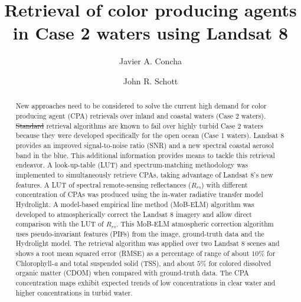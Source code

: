 \documentclass[onecolumn,3p,letterpaper]{elsarticle}
\providecommand{\DIFaddtex}[1]{{\protect\color{blue}\uwave{#1}}} %
\providecommand{\DIFdeltex}[1]{{\protect\color{red}\sout{#1}}}                      %
\providecommand{\DIFaddbegin}{} %
\providecommand{\DIFaddend}{} %
\providecommand{\DIFdelbegin}{} %
\providecommand{\DIFdelend}{} %
\providecommand{\DIFadd}[1]{\texorpdfstring{\DIFaddtex{#1}}{#1}} %
\providecommand{\DIFdel}[1]{\texorpdfstring{\DIFdeltex{#1}}{}} %
\begin{document}
\linenumbers

\begin{frontmatter}

\title{Retrieval of color producing agents in Case 2 waters using Landsat 8}


\author[mymainaddress]{Javier A. Concha}

\author[mymainaddress]{John R. Schott}
\address[mymainaddress]{Rochester Institute of Technology (RIT), NY 14623, USA}
\begin{abstract}

New approaches need to be considered to solve the current high demand for color producing agent (CPA) retrievals over inland and coastal waters (Case 2 waters). 
%
\DIFdelbegin \DIFdel{Standard }\DIFdelend \DIFaddbegin \DIFadd{Traditional }\DIFaddend retrieval algorithms are known to fail over highly turbid Case 2 waters because they were developed specifically for the open ocean (Case 1 waters). 
%
Landsat 8 provides an improved signal-to-noise ratio (SNR) and a new spectral coastal aerosol band in the blue. 
%
This additional information provides means to tackle this retrieval endeavor. 
A look-up-table (LUT) and spectrum-matching methodology was implemented to simultaneously retrieve CPAs, taking advantage of Landsat 8's new features. 
%
A LUT of spectral remote-sensing reflectances ($R_{rs}$) with different concentration of CPAs was produced using the in-water radiative transfer model Hydrolight. 
%
A model-based empirical line method (MoB-ELM) algorithm was developed to atmospherically correct the Landsat 8 imagery and allow direct comparison with the LUT of $R_{rs}$. 
%
This MoB-ELM atmospheric correction algorithm uses pseudo-invariant features (PIFs) from the image, ground-truth data and the Hydrolight model.
The retrieval algorithm was applied over two Landsat 8 scenes and shows a root mean squared error (RMSE) as a percentage of range of about $10\%$ for Chlorophyll-{\it a} and total suspended solid (TSS), and about $5\%$ for colored dissolved organic matter (CDOM) when compared with ground-truth data. The CPA concentration maps exhibit expected trends of low concentrations in clear water and higher concentrations in turbid water.


\end{abstract}
\end{frontmatter}
\end{document}
